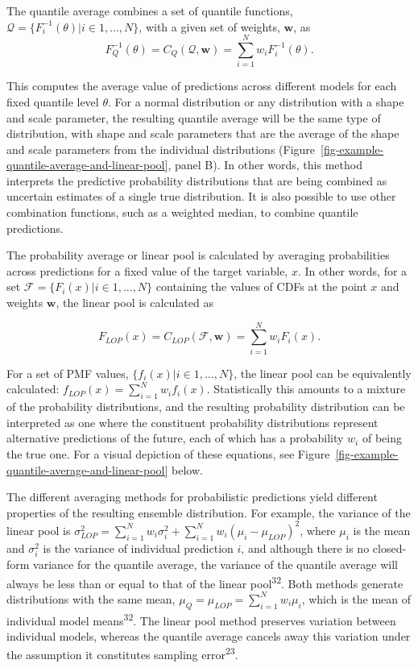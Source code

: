 \documentclass[
  letterpaper,
  DIV=11,
  numbers=noendperiod]{scrartcl}
\begin{document}
The quantile average combines a set of quantile functions,
\(\mathcal{Q} = \{F_i^{-1}(\theta)| i \in 1,...,N \}\), with a given set
of weights, \(\pmb{w}\), as \[
F^{-1}_Q(\theta) = C_Q(\mathcal{Q}, \pmb{w}) = \sum_{i = 1}^Nw_iF^{-1}_i(\theta).
\]

This computes the average value of predictions across different models
for each fixed quantile level \(\theta\). For a normal distribution or
any distribution with a shape and scale parameter, the resulting
quantile average will be the same type of distribution, with shape and
scale parameters that are the average of the shape and scale parameters
from the individual distributions
(Figure~\ref{fig-example-quantile-average-and-linear-pool}, panel B). In
other words, this method interprets the predictive probability
distributions that are being combined as uncertain estimates of a single
true distribution. It is also possible to use other combination
functions, such as a weighted median, to combine quantile predictions.

The probability average or linear pool is calculated by averaging
probabilities across predictions for a fixed value of the target
variable, \(x\). In other words, for a set
\(\mathcal{F} = \{F_i(x)| i \in 1,...,N \}\) containing the values of
CDFs at the point \(x\) and weights \(\pmb{w}\), the linear pool is
calculated as

\[
F_{LOP}(x) = C_{LOP}(\mathcal{F}, \pmb{w}) = \sum_{i = 1}^Nw_iF_i(x). 
\]

For a set of PMF values, \(\{f_i(x)|i \in 1, ..., N\}\), the linear pool
can be equivalently calculated:
\(f_{LOP}(x) = \sum_{i = 1}^N w_i f_i(x)\). Statistically this amounts
to a mixture of the probability distributions, and the resulting
probability distribution can be interpreted as one where the constituent
probability distributions represent alternative predictions of the
future, each of which has a probability \(w_i\) of being the true one.
For a visual depiction of these equations, see
Figure~\ref{fig-example-quantile-average-and-linear-pool} below.

The different averaging methods for probabilistic predictions yield
different properties of the resulting ensemble distribution. For
example, the variance of the linear pool is
\(\sigma^2_{LOP} = \sum_{i=1}^Nw_i\sigma_i^2 + \sum_{i=1}^Nw_i(\mu_i-\mu_{LOP})^2\),
where \(\mu_i\) is the mean and \(\sigma^2_i\) is the variance of
individual prediction \(i\), and although there is no closed-form
variance for the quantile average, the variance of the quantile average
will always be less than or equal to that of the linear
pool\textsuperscript{32}. Both methods generate distributions with the
same mean, \(\mu_Q = \mu_{LOP} = \sum_{i=1}^Nw_i\mu_i\), which is the
mean of individual model means\textsuperscript{32}. The linear pool
method preserves variation between individual models, whereas the
quantile average cancels away this variation under the assumption it
constitutes sampling error\textsuperscript{23}.
\end{document}
